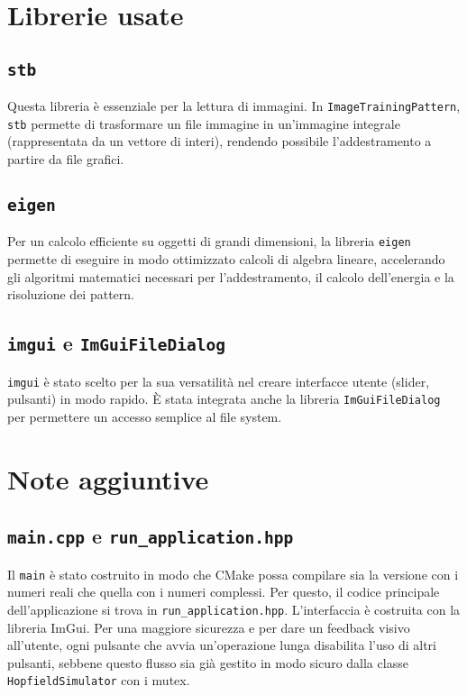 \documentclass{article}
\begin{document}
\section{Librerie usate}
\subsection{\texttt{stb}}
Questa libreria è essenziale per la lettura di immagini. In \texttt{ImageTrainingPattern}, \texttt{stb} permette di trasformare un file immagine in un'immagine integrale (rappresentata da un vettore di interi), rendendo possibile l'addestramento a partire da file grafici.
\subsection{\texttt{eigen}}
Per un calcolo efficiente su oggetti di grandi dimensioni, la libreria \texttt{eigen} permette di eseguire in modo ottimizzato calcoli di algebra lineare, accelerando gli algoritmi matematici necessari per l'addestramento, il calcolo dell'energia e la risoluzione dei pattern.
\subsection{\texttt{imgui} e \texttt{ImGuiFileDialog}}
\texttt{imgui} è stato scelto per la sua versatilità nel creare interfacce utente (slider, pulsanti) in modo rapido. È stata integrata anche la libreria \texttt{ImGuiFileDialog} per permettere un accesso semplice al file system.

\section{Note aggiuntive}
\subsection{\texttt{main.cpp} e \texttt{run\_application.hpp}}
Il \texttt{main} è stato costruito in modo che CMake possa compilare sia la versione con i numeri reali che quella con i numeri complessi. Per questo, il codice principale dell'applicazione si trova in \texttt{run\_application.hpp}. L'interfaccia è costruita con la libreria ImGui. Per una maggiore sicurezza e per dare un feedback visivo all'utente, ogni pulsante che avvia un'operazione lunga disabilita l'uso di altri pulsanti, sebbene questo flusso sia già gestito in modo sicuro dalla classe \texttt{HopfieldSimulator} con i mutex.
\end{document}
